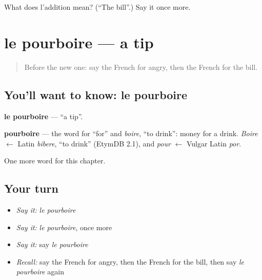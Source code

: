 \begin{tcolorbox}[breakable,colback=teal!4,colframe=teal!35!black,title={Before you move on}]
What does l'addition mean? (\textquotedblleft{}The bill\textquotedblright{}.) Say it once more.
\end{tcolorbox}
\section[le pourboire]{le pourboire — a tip}

\label{lesson:FR-C247-pourboire}



\begin{quote}
Before the new one: say the French for angry, then the French for the bill.
\end{quote}

\subsection*{You'll want to know: le pourboire}
\textbf{le pourboire} — \textquotedblleft{}a tip\textquotedblright{}.

\begin{cousinweb}
\textbf{pourboire} — the word for \textquotedblleft{}for\textquotedblright{} and \emph{boire}, \textquotedblleft{}to drink\textquotedblright{}: money for a drink. \emph{Boire} $\leftarrow$ Latin \emph{bibere}, \textquotedblleft{}to drink\textquotedblright{} (EtymDB 2.1), and \emph{pour} $\leftarrow$ Vulgar Latin \emph{por}.
\end{cousinweb}

\begin{grammarlens}[title={What you've built}]
One more word for this chapter.
\end{grammarlens}

\subsection*{Your turn}
\begin{itemize}
\raggedright
  \item \emph{Say it:} \emph{le pourboire}
  \item \emph{Say it:} \emph{le pourboire}, once more
  \item \emph{Say it:} say \emph{le pourboire}
  \item \emph{Recall:} say the French for angry, then the French for the bill, then say \emph{le pourboire} again
\end{itemize}

